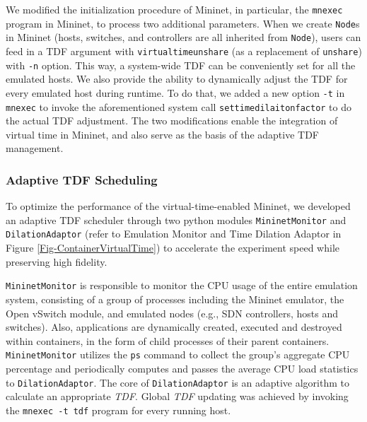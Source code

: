 We modified the initialization procedure of Mininet, in particular, the \texttt{mnexec} program in Mininet, to process two additional parameters. When we create \texttt{Node}s in Mininet (hosts, switches, and controllers are all inherited from \texttt{Node}), users can feed in a TDF argument with \texttt{virtualtimeunshare} (as a replacement of \texttt{unshare}) with \texttt{-n} option. This way, a system-wide TDF can be conveniently set for all the emulated hosts. We also provide the ability to dynamically adjust the TDF for every emulated host during runtime. To do that, we added a new option \texttt{-t} in \texttt{mnexec} to invoke the aforementioned system call \texttt{settimedilaitonfactor} to do the actual TDF adjustment. The two modifications enable the integration of virtual time in Mininet, and also serve as the basis of the adaptive TDF management.

\subsubsection{Adaptive TDF Scheduling}
To optimize the performance of the virtual-time-enabled Mininet, we developed an adaptive TDF scheduler through two python modules \texttt{MininetMonitor} and \texttt{DilationAdaptor} (refer to Emulation Monitor and Time Dilation Adaptor in Figure \ref{Fig-ContainerVirtualTime}) to accelerate the experiment speed while preserving high fidelity.

\texttt{MininetMonitor} is responsible to monitor the CPU usage of the entire emulation system, consisting of a group of processes including the Mininet emulator, the Open vSwitch module, and emulated nodes (e.g., SDN controllers, hosts and switches). Also, applications are dynamically created, executed and destroyed within containers, in the form of child processes of their parent containers. \texttt{MininetMonitor} utilizes the \texttt{ps} command to collect the group's aggregate CPU percentage and periodically computes and passes the average CPU load statistics to \texttt{DilationAdaptor}. The core of \texttt{DilationAdaptor} is an adaptive algorithm to calculate an appropriate \textit{TDF}. %
Global \textit{TDF} updating was achieved by invoking the \texttt{mnexec\ -t\ tdf} program for every running host. 



